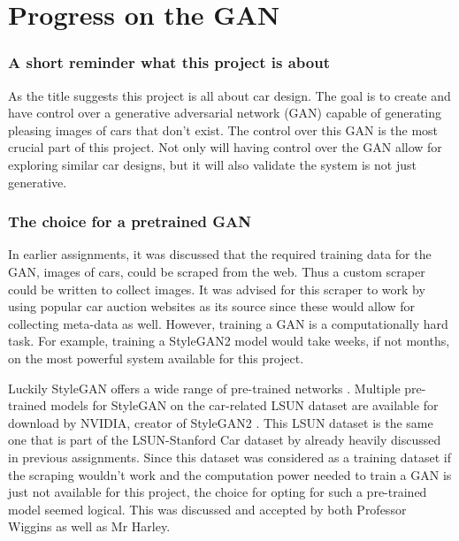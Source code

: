 \part{Progress on the GAN}
\label{part:progress_on_gan}


\section{A short reminder what this project is about}
\label{sec:short_reminder}

As the title suggests this project is all about car design.
The goal is to create and have control over a generative adversarial network (GAN) capable of generating pleasing images of cars that don't exist.
The control over this GAN is the most crucial part of this project.
Not only will having control over the GAN allow for exploring similar car designs, but it will also validate the system is not just generative. 


\section{The choice for a pretrained GAN}
\label{sec:pretraind_gan}

In earlier assignments, it was discussed that the required training data for the GAN, images of cars, could be scraped from the web.
Thus a custom scraper could be written to collect images.
It was advised for this scraper to work by using popular car auction websites as its source since these would allow for collecting meta-data as well.
However, training a GAN is a computationally hard task.
For example, training a StyleGAN2 model would take weeks, if not months, on the most powerful system available for this project.

Luckily StyleGAN offers a wide range of pre-trained networks \citep{stylegan2}.
Multiple pre-trained models for StyleGAN on the car-related LSUN dataset are available for download by NVIDIA, creator of StyleGAN2 \citep{stylegan2}.
This LSUN dataset is the same one that is part of the LSUN-Stanford Car dataset by \citet{cardb} already heavily discussed in previous assignments.
Since this dataset was considered as a training dataset if the scraping wouldn't work and the computation power needed to train a GAN is just not available for this project, the choice for opting for such a pre-trained model seemed logical.
This was discussed and accepted by both Professor Wiggins as well as Mr Harley.

